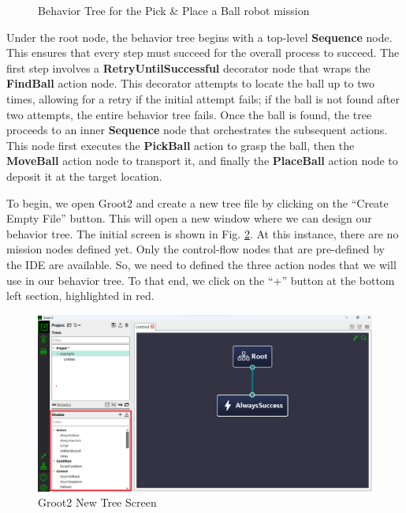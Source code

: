 \documentclass{CSSRforAfrica}
\begin{document}
\begin{figure}[htbp]
    
    \caption{Behavior Tree for the Pick \& Place a Ball robot mission}
    \label{fig:pick_place_tree}
\end{figure}

Under the root node, the behavior tree begins with a top-level \textbf{Sequence} node. This ensures that every step must succeed for the overall process to succeed. The first step involves a \textbf{RetryUntilSuccessful} decorator node that wraps the \textbf{FindBall} action node. This decorator attempts to locate the ball up to two times, allowing for a retry if the initial attempt fails; if the ball is not found after two attempts, the entire behavior tree fails. Once the ball is found, the tree proceeds to an inner \textbf{Sequence} node that orchestrates the subsequent actions. This node first executes the \textbf{PickBall} action to grasp the ball, then the \textbf{MoveBall} action node to transport it, and finally the \textbf{PlaceBall} action node to deposit it at the target location.


To begin, we open Groot2 and create a new tree file by clicking on the ``Create Empty File'' button. This will open a new window where we can design our behavior tree. The initial screen is shown in Fig. \ref{fig:groot2_new_tree}.
At this instance, there are no mission nodes defined yet. Only the control-flow nodes that are pre-defined by the IDE are available. So, we need to defined the three action nodes that we will use in our behavior tree. To that end, we click on the ``+'' button at the bottom left section, highlighted in red.


\begin{figure}[h]
    \centering
    \includegraphics[width=120mm]{images/groot2_newtree.png}
    \caption{Groot2 New Tree Screen}
    \label{fig:groot2_new_tree}
\end{figure}
\end{document}
